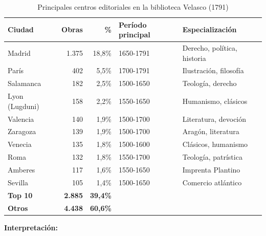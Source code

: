 \documentclass[11pt,a4paper]{article}
\begin{document}
\begin{table}[h]
\centering
\begin{tabular}{lrrll}
\toprule
\textbf{Ciudad} & \textbf{Obras} & \textbf{\%} & \textbf{Período principal} & \textbf{Especialización} \\
\midrule
\rowcolor{yellow!20}
Madrid & 1.375 & 18,8\% & 1650-1791 & Derecho, política, historia \\
\rowcolor{green!20}
París & 402 & 5,5\% & 1700-1791 & Ilustración, filosofía \\
Salamanca & 182 & 2,5\% & 1500-1650 & Teología, derecho \\
Lyon (Lugduni) & 158 & 2,2\% & 1550-1650 & Humanismo, clásicos \\
Valencia & 140 & 1,9\% & 1500-1700 & Literatura, devoción \\
Zaragoza & 139 & 1,9\% & 1500-1700 & Aragón, literatura \\
Venecia & 135 & 1,8\% & 1500-1600 & Clásicos, humanismo \\
Roma & 132 & 1,8\% & 1550-1700 & Teología, patrística \\
Amberes & 117 & 1,6\% & 1550-1650 & Imprenta Plantino \\
Sevilla & 105 & 1,4\% & 1500-1650 & Comercio atlántico \\
\midrule
\textbf{Top 10} & \textbf{2.885} & \textbf{39,4\%} & & \\
\textbf{Otros} & \textbf{4.438} & \textbf{60,6\%} & & \\
\bottomrule
\end{tabular}
\caption{Principales centros editoriales en la biblioteca Velasco (1791)}
\end{table}

\textbf{Interpretación:}
\end{document}
